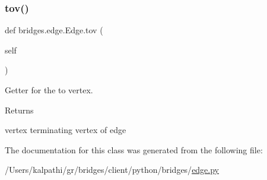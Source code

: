 \subsubsection{\texorpdfstring{tov()}{tov()}}
{\footnotesize\ttfamily def bridges.\+edge.\+Edge.\+tov (\begin{DoxyParamCaption}\item[{}]{self }\end{DoxyParamCaption})}



Getter for the to vertex. 

\begin{DoxyReturn}{Returns}


vertex terminating vertex of edge 
\end{DoxyReturn}


The documentation for this class was generated from the following file\+:\begin{DoxyCompactItemize}
\item 
/\+Users/kalpathi/gr/bridges/client/python/bridges/\mbox{\hyperlink{edge_8py}{edge.\+py}}\end{DoxyCompactItemize}
